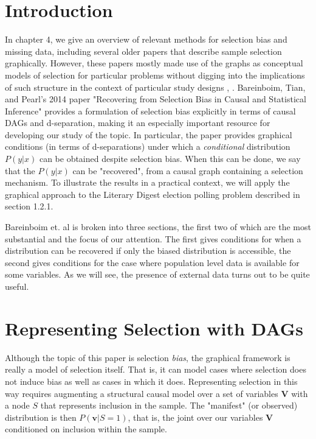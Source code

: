 \documentclass[12pt,twoside]{reedthesis}
\theoremstyle{definition}
\begin{document}
\section{Introduction}
In chapter 4, we give an overview of relevant methods for selection bias and missing data, including several older papers that describe sample selection graphically. However, these papers mostly made use of the graphs as conceptual models of selection for particular problems without digging into the implications of such structure in the context of particular study designs \citep{Hernan_2004}, \citep{Geneletti_2008}. Bareinboim, Tian, and Pearl's 2014 paper "Recovering from Selection Bias in Causal and Statistical Inference" provides a formulation of selection bias explicitly in terms of causal DAGs and d-separation, making it an especially important resource for developing our study of the topic. In particular, the paper provides graphical conditions (in terms of d-separations) under which a \emph{conditional} distribution $P(y | x)$ can be obtained despite selection bias. When this can be done, we say that the $P(y | x)$ can be "recovered", from a causal graph containing a selection mechanism. To illustrate the results in a practical context, we will apply the graphical approach to the Literary Digest election polling problem described in section 1.2.1.

Bareinboim et. al is broken into three sections, the first two of which are the most substantial and the focus of our attention. The first gives conditions for when a distribution can be recovered if only the biased distribution is accessible, the second gives conditions for the case where population level data is available for some variables. As we will see, the presence of external data turns out to be quite useful.

\section{Representing Selection with DAGs}

Although the topic of this paper is selection \emph{bias}, the graphical framework is really a model of selection itself. That is, it can model cases where selection does not induce bias as well as cases in which it does. Representing selection in this way requires augmenting  a structural causal model over a set of variables $\mathbf{V}$ with a node $S$ that represents inclusion in the sample. The  "manifest" (or observed) distribution is then $P(\mathbf{v} | S = 1)$, that is, the joint over our variables $\mathbf{V}$ conditioned on inclusion within the sample.  
\end{document}
